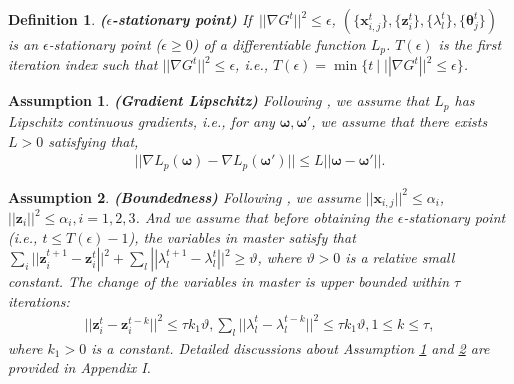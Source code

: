 \documentclass[letterpaper]{article} %
\newtheorem{definition}{Definition}
\newtheorem{assumption}{Assumption}
\begin{document}
\begin{definition}
\label{definition:e stationary point}
{\textbf{($\epsilon$-stationary point)}} If $\,||\nabla G^t||^2 \le \epsilon $,  $(\{{\boldsymbol{x}_{i,j}^t}\} ,\! \{{\boldsymbol{z}_i^t}\},\! \{\lambda_l^t\}, \!\{\boldsymbol{\theta}_j^t\} )$ is an $\epsilon$-stationary point ($\epsilon  \ge 0$) of a differentiable function ${L_p}$.  $T(\epsilon )$ is the first iteration index such that $||\nabla G^t||^2   \le  \epsilon$, \textit{i.e.}, $T(\epsilon )  =  \min \{ t \ |\; ||\nabla G^t||^2   \le  \epsilon \}  $.
\end{definition}


\begin{assumption}\label{assumption:1}
\textbf{{{(Gradient Lipschitz})}} Following \cite{ji2021bilevel}, we assume that
$L_p$ has Lipschitz continuous gradients, i.e., for any $\boldsymbol{\omega}, \boldsymbol{\omega}'$, we assume that there exists $L>0$ satisfying that,
\begin{equation}
\begin{array}{l}
||{\nabla}{L_p}(\boldsymbol{\omega})  -  {\nabla}{L_p}(\boldsymbol{\omega}')|| \le L||\boldsymbol{\omega}-\boldsymbol{\omega}'||.
\end{array}
\end{equation}
\end{assumption}


\begin{assumption}\label{assumption:2}
{\textbf{(Boundedness)}} Following \cite{qian2019robust,jiao2022asynchronous}, we assume $||\boldsymbol{x}_{i,j}||^2\!\le\!\alpha_i$, $||\boldsymbol{z}_i||^2\!\le\!\alpha_i,i=1,2,3$. And we assume that before obtaining the $\epsilon$-stationary point (i.e., $t\!\le\! T(\epsilon )\!-\!1$), the variables in master satisfy that $\sum\nolimits_i||\boldsymbol{z}_i^{t+1} \!-\! \boldsymbol{z}_i^t|{|^2}\!+\!\sum\nolimits_l||{\lambda _l^{t + 1}} \!-\! {\lambda _l^t}|{|^2} \ge \vartheta $, where $\vartheta >0$ is a relative small constant. The change of the variables in master is upper bounded within $\tau$ iterations:
\begin{equation}
\begin{array}{*{20}{l}}
\!{\!||\boldsymbol{z}_i^t \!-\! \boldsymbol{z}_i^{t - k}|{|^2} \! \le \! \tau{k_1}\vartheta},
{\sum\nolimits_l \! ||{\lambda _l^t} \!-\! {\lambda _l^{t - k}}|{|^2} \! \le \! \tau{k_1}\vartheta}, {1 \! \le \! k \! \le \! \tau },
\end{array}
\end{equation}
where $k_1 >0$ is a constant. Detailed discussions about Assumption \ref{assumption:1} and \ref{assumption:2} are provided in Appendix I.
\end{assumption}
\end{document}
